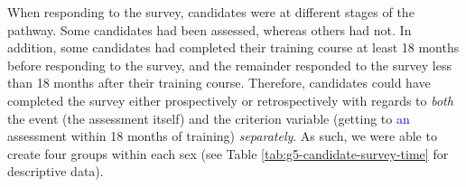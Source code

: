 \documentclass[
  12pt,
  a4paper,
]{book}
\begin{document}
\begin{table}[H]

\caption{\label{tab:group-5-pra-descriptives}Participant descriptive statistics.}
\centering
{}
\end{table}

When responding to the survey, candidates were at different stages of the pathway. Some candidates had been assessed, whereas others had not. In addition, some candidates had completed their training course at least 18 months before responding to the survey, and the remainder responded to the survey less than 18 months after their training course. Therefore, candidates could have completed the survey either prospectively or retrospectively with regards to \emph{both} the event (the assessment itself) and the criterion variable (getting to \textcolor{blue}{an} assessment within 18 months of training) \emph{separately}. As such, we were able to create four groups within each sex (see Table \ref{tab:g5-candidate-survey-time} for descriptive data).
\end{document}
